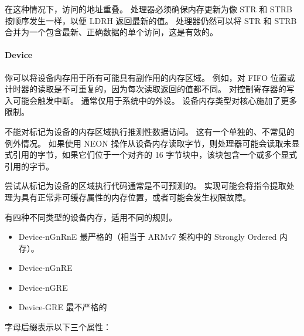 在这种情况下，访问的地址重叠。
处理器必须确保内存更新为像 STR 和 STRB 按顺序发生一样，以便 LDRH 返回最新的值。
处理器仍然可以将 STR 和 STRB 合并为一个包含最新、正确数据的单个访问，这是有效的。

\paragraph*{Device}

你可以将设备内存用于所有可能具有副作用的内存区域。
例如，对 FIFO 位置或计时器的读取是不可重复的，因为每次读取返回的值都不同。
对控制寄存器的写入可能会触发中断。
通常仅用于系统中的外设。
设备内存类型对核心施加了更多限制。

不能对标记为设备的内存区域执行推测性数据访问。
这有一个单独的、不常见的例外情况。
如果使用 NEON 操作从设备内存读取字节，则处理器可能会读取未显式引用的字节，如果它们位于一个对齐的 16 字节块中，该块包含一个或多个显式引用的字节。

尝试从标记为设备的区域执行代码通常是不可预测的。
实现可能会将指令提取处理为具有正常非可缓存属性的内存位置，或者可能会发生权限故障。

有四种不同类型的设备内存，适用不同的规则。

\begin{itemize}
\item
  Device-nGnRnE 最严格的（相当于 ARMv7 架构中的 Strongly Ordered 内存）。
\item
  Device-nGnRE
\item
  Device-nGRE
\item
  Device-GRE 最不严格的
\end{itemize}

字母后缀表示以下三个属性：

